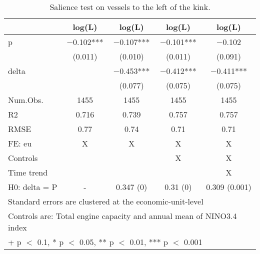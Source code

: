 \begin{table}

\caption{\label{tab:}Salience test on vessels to the left of the kink.}
\centering
\begin{tabular}[t]{lcccc}
\toprule
  & log(L) & log(L)  & log(L)   & log(L)   \\
\midrule
p & \num{-0.102}*** & \num{-0.107}*** & \num{-0.101}*** & \num{-0.102}\\
 & (\num{0.011}) & (\num{0.010}) & (\num{0.011}) & (\num{0.091})\\
delta &  & \num{-0.453}*** & \num{-0.412}*** & \num{-0.411}***\\
 &  & (\num{0.077}) & (\num{0.075}) & (\num{0.075})\\
\midrule
Num.Obs. & \num{1455} & \num{1455} & \num{1455} & \num{1455}\\
R2 & \num{0.716} & \num{0.739} & \num{0.757} & \num{0.757}\\
RMSE & \num{0.77} & \num{0.74} & \num{0.71} & \num{0.71}\\
FE: eu & X & X & X & X\\
Controls &  &  & X & X\\
Time trend &  &  &  & X\\
H0: delta = P & - & 0.347 (0) & 0.31 (0) & 0.309 (0.001)\\
\bottomrule
\multicolumn{5}{l}{\rule{0pt}{1em}Standard errors are clustered at the economic-unit-level}\\
\multicolumn{5}{l}{\rule{0pt}{1em}Controls are: Total engine capacity and annual mean of NINO3.4 index}\\
\multicolumn{5}{l}{\rule{0pt}{1em}+ p $<$ 0.1, * p $<$ 0.05, ** p $<$ 0.01, *** p $<$ 0.001}\\
\end{tabular}
\end{table}
